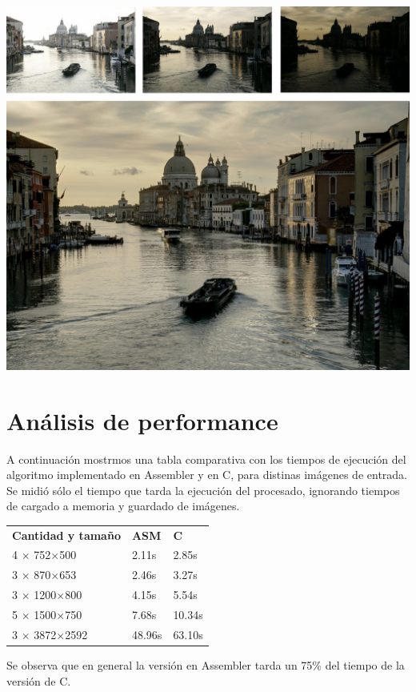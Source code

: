 \documentclass[a4paper,10pt]{article}
\begin{document}
        \includegraphics[width=\textwidth]{fused4.jpg}

    \section{Análisis de performance}
    
        A continuación mostrmos una tabla comparativa con los tiempos de ejecución del algoritmo implementado en Assembler y en C, para distinas imágenes de entrada. Se midió sólo el tiempo que tarda la ejecución del procesado, ignorando tiempos de cargado a memoria y guardado de imágenes.

        \bigskip
        \begin{tabular}{lll}
        \textbf{Cantidad y tamaño} & \textbf{ASM} & \textbf{C}\\
        4 $\times$ 752$\times$500 & 2.11s & 2.85s\\
        3 $\times$ 870$\times$653 & 2.46s & 3.27s\\
        3 $\times$ 1200$\times$800 & 4.15s & 5.54s\\
        5 $\times$ 1500$\times$750 & 7.68s & 10.34s\\
        3 $\times$ 3872$\times$2592 & 48.96s & 63.10s\\
        \end{tabular}
        \bigskip
        
        Se observa que en general la versión en Assembler tarda un 75\% del tiempo de la versión de C.
\end{document}
